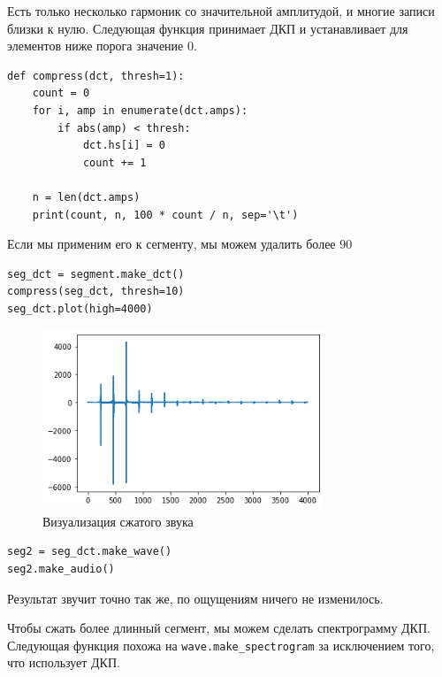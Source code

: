 \documentclass[a4paper,12pt]{report}
\begin{document}
Есть только несколько гармоник со значительной амплитудой, и многие записи близки к нулю. Следующая функция принимает ДКП и устанавливает для элементов ниже порога значение 0.

\begin{lstlisting}[caption=Функция \texttt{compress}]
def compress(dct, thresh=1):
    count = 0
    for i, amp in enumerate(dct.amps):
        if abs(amp) < thresh:
            dct.hs[i] = 0
            count += 1
            
    n = len(dct.amps)
    print(count, n, 100 * count / n, sep='\t')
\end{lstlisting}

Если мы применим его к сегменту, мы можем удалить более 90%

\begin{lstlisting}[caption=Сжатие звука]
seg_dct = segment.make_dct()
compress(seg_dct, thresh=10)
seg_dct.plot(high=4000)
\end{lstlisting}

\begin{figure}[H]
        \centering
        \includegraphics[width=0.75\textwidth]{lab6_fig2_2.png}
        \caption{Визуализация сжатого звука}
        \label{fig:lab6_fig2_2}
\end{figure}

\begin{lstlisting}[caption=Воспроизведение сжатого звука]
seg2 = seg_dct.make_wave()
seg2.make_audio()
\end{lstlisting}

Результат звучит точно так же, по ощущениям ничего не изменилось.

Чтобы сжать более длинный сегмент, мы можем сделать спектрограмму ДКП. Следующая функция похожа на \texttt{wave.make\_spectrogram} за исключением того, что использует ДКП.
\end{document}
